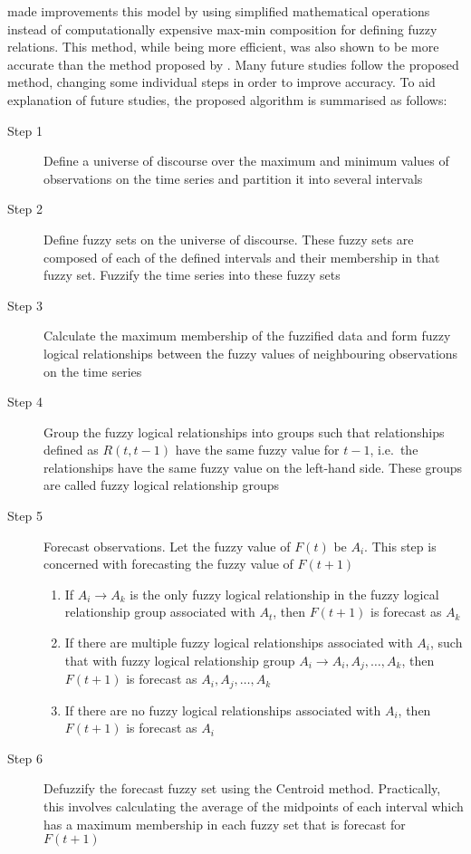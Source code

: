\documentclass{article}
\theoremstyle{definition}
\begin{document}
\cite{chen1996forecasting} made improvements this model by using simplified mathematical operations instead of computationally expensive max-min composition for defining fuzzy relations. This method, while being more efficient, was also shown to be more accurate than the method proposed by \cite{song1993forecasting}. Many future studies follow the proposed method, changing some individual steps in order to improve accuracy. To aid explanation of future studies, the proposed algorithm is summarised as follows:

\begin{description}
\item[Step 1] Define a universe of discourse over the maximum and minimum values of observations on the time series and partition it into several intervals
\item[Step 2] Define fuzzy sets on the universe of discourse. These fuzzy sets are composed of each of the defined intervals and their membership in that fuzzy set. Fuzzify the time series into these fuzzy sets
\item[Step 3] Calculate the maximum membership of the fuzzified data and form fuzzy logical relationships between the fuzzy values of neighbouring observations on the time series
\item[Step 4] Group the fuzzy logical relationships into groups such that relationships defined as $R(t,t-1)$ have the same fuzzy value for $t-1$, i.e.\ the relationships have the same fuzzy value on the left-hand side. These groups are called fuzzy logical relationship groups
\item[Step 5] Forecast observations. Let the fuzzy value of $F(t)$ be $A_i$. This step is concerned with forecasting the fuzzy value of $F(t+1)$
\begin{enumerate}
\item If  $A_i \rightarrow A_k$ is the only fuzzy logical relationship in the fuzzy logical relationship group associated with $A_t$, then $F(t+1)$ is forecast as $A_k$ 
\item If there are multiple fuzzy logical relationships associated with $A_i$, such that with fuzzy logical relationship group $A_i \rightarrow A_{i}, A_{j}, \ldots, A_{k}$, then $F(t+1)$ is forecast as $A_{i}, A_{j}, \ldots, A_{k}$
\item If there are no fuzzy logical relationships associated with $A_i$, then $F(t+1)$ is forecast as $A_i$
\end{enumerate}
\item[Step 6] Defuzzify the forecast fuzzy set using the Centroid method. Practically, this involves calculating the average of the midpoints of each interval which has a maximum membership in each fuzzy set that is forecast for $F(t+1)$
\end{description}
\end{document}
